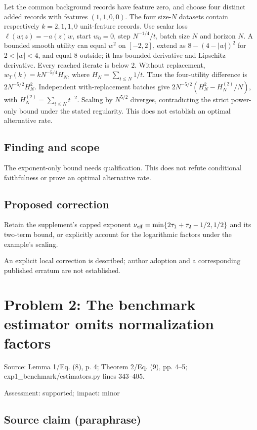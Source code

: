 \documentclass[11pt]{article}
\begin{document}
Let the common background records have feature zero, and choose four distinct added records with features \((1,1,0,0)\). The four size-\(N\) datasets contain respectively \(k=2,1,1,0\) unit-feature records. Use scalar loss \(\ell(w;z)=-a(z)w\), start \(w_0=0\), step \(N^{-1/4}/t\), batch size \(N\) and horizon \(N\). A bounded smooth utility can equal \(w^2\) on \([-2,2]\), extend as \(8-(4-|w|)^2\) for \(2<|w|<4\), and equal \(8\) outside; it has bounded derivative and Lipschitz derivative. Every reached iterate is below \(2\). Without replacement, \(w_T(k)=kN^{-5/4}H_N\), where \(H_N=\sum_{t\leq N}1/t\). Thus the four-utility difference is \(2N^{-5/2}H_N^2\). Independent with-replacement batches give \(2N^{-5/2}(H_N^2-H_N^{(2)}/N)\), with \(H_N^{(2)}=\sum_{t\leq N}t^{-2}\). Scaling by \(N^{5/2}\) diverges, contradicting the strict power-only bound under the stated regularity. This does not establish an optimal alternative rate.

\subsection*{Finding and scope}

The exponent-only bound needs qualification. This does not refute conditional faithfulness or prove an optimal alternative rate.

\subsection*{Proposed correction}

Retain the supplement’s capped exponent \(\nu_{\rm eff}=\min\{2\tau_1+\tau_2-1/2,1/2\}\) and its two-term bound, or explicitly account for the logarithmic factors under the example’s scaling.

An explicit local correction is described; author adoption and a corresponding published erratum are not established.

\section*{Problem 2: The benchmark estimator omits normalization factors}

Source: Lemma 1/Eq. (8), p. 4; Theorem 2/Eq. (9), pp. 4–5; exp1\_benchmark/estimators.py lines 343–405.

Assessment: supported; impact: minor

\subsection*{Source claim (paraphrase)}
\end{document}
